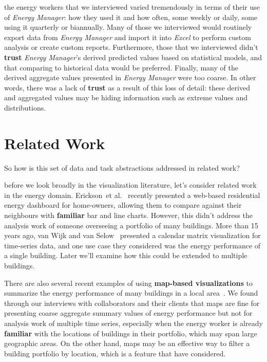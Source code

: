 \documentclass[journal]{vgtc}                %
\newcommand{\bstart}[1]{\vspace{1mm} \noindent{\textbf{#1:}}}
\newcommand{\etal}{et al.}
\begin{document}
\bstart{Interview observations} the energy workers that we interviewed varied tremendously in terms of their use of {\it Energy Manager}: how they used it and how often, some weekly or daily, some using it quarterly or biannually.
Many of those we interviewed would routinely export data from {\it Energy Manager} and import it into {\it Excel} to perform custom analysis or create custom reports.
Furthermore, those that we interviewed didn't {\bf trust} {\it Energy Manager}'s derived predicted values based on statistical models, and that comparing to historical data would be preferred.
Finally, many of the derived aggregate values presented in {\it Energy Manager} were too coarse. In other words, there was a lack of {\bf trust} as a result of this loss of detail: these derived and aggregated values may be hiding information such as extreme values and distributions.


\section{Related Work}
\label{related-work}


So how is this set of data and task abstractions addressed in related work?

\bstart{Energy visualization} before we look broadly in the visualization literature, let's consider related work in the energy domain.
Erickson~\etal~\cite{Erickson2013} recently presented a web-based residential energy dashboard for home-owners, allowing them to compare against their neighbours with {\bf familiar} bar and line charts. 
However, this didn't address the analysis work of someone overseeing a portfolio of many buildings.
More than 15 years ago, van Wijk and van Selow~\cite{vanWijk1999} presented a calendar matrix visualization for time-series data, and one use case they considered was the energy performance of a single building.
Later we'll examine how this could be extended to multiple buildings.

There are also several recent examples of using {\bf map-based visualizations} to summarize the energy performance of many buildings in a local area~\cite{Heat2014,MEP2014}.
We found through our interviews with collaborators and their clients that maps are fine for presenting coarse aggregate summary values of energy performance but not for analysis work of multiple time series, especially when the energy worker is already {\bf familiar} with the locations of buildings in their portfolio, which may span large geographic areas. 
On the other hand, maps may be an effective way to filter a building portfolio by location, which is a feature that have considered.
\end{document}
